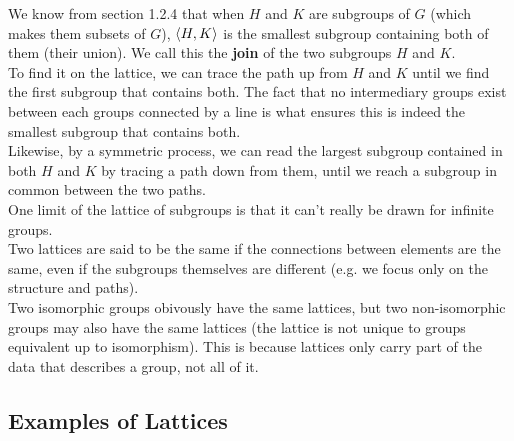 \documentclass[12pt]{article}
\begin{document}
    We know from section 1.2.4 that 
    when $H$ and $K$ are subgroups of $G$
    (which makes them subsets of $G$),
    $\left\langle H, K \right\rangle$
    is the smallest subgroup containing both of them
    (their union).
    We call this the \textbf{join} of the two subgroups $H$ and $K$. \\
    To find it on the lattice,
    we can trace the path up from $H$ and $K$
    until we find the first subgroup that contains both.
    The fact that no intermediary groups exist
    between each groups connected by a line is what ensures
    this is indeed the smallest subgroup that contains both. \\
    Likewise, by a symmetric process,
    we can read the largest subgroup contained in both $H$
    and $K$ by tracing a path down from them,
    until we reach a subgroup in common between the two paths. \\

    One limit of the lattice of subgroups is that it can't
    really be drawn for infinite groups. \\

    Two lattices are said to be the same if the
    connections between elements are the same,
    even if the subgroups themselves are different
    (e.g. we focus only on the structure and paths). \\
    Two isomorphic groups obivously have the same lattices,
    but two non-isomorphic groups may also have the same lattices
    (the lattice is not unique to groups equivalent
    up to isomorphism).
    This is because lattices only carry part of the data
    that describes a group, not all of it. \\

    \subsection*{Examples of Lattices}
\end{document}
